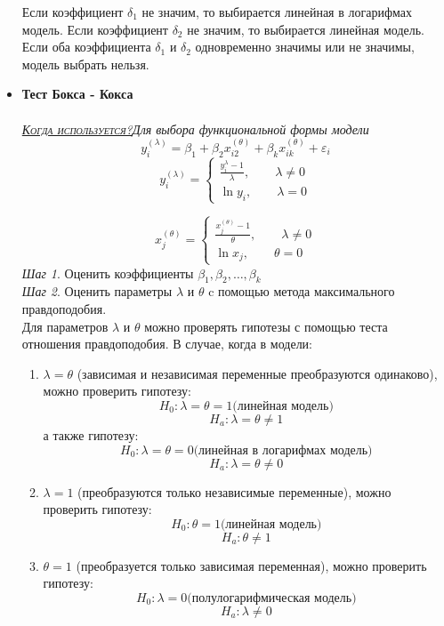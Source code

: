 \documentclass[a0,final]{a0poster}
\begin{document}
\begin{multicols}{4}
\begin{itemize}
Если коэффициент ${\delta}_1$ не значим, то выбирается линейная в логарифмах модель. Если коэффициент ${\delta}_2$ не значим, то выбирается линейная модель. Если оба коэффициента ${\delta}_1$ и ${\delta}_2$ одновременно значимы или не значимы, модель выбрать нельзя.  \\
\item \textbf{Тест Бокса - Кокса}\\
\\
\underline{\textsc{\textit{Когда используется?}}}\textit{Для выбора функциональной формы модели}\\
\[y_i^{(\lambda)} = \beta_1 + \beta_2x_{i2}^{(\theta)} + \beta_kx_{ik}^{(\theta)} + \varepsilon_i\]
\[
y_i^{(\lambda)} =
 \begin{cases}
\frac{y_i^\lambda - 1}{\lambda}, \qquad \lambda \neq 0 \\
\ln{y_i}, \qquad \lambda = 0
\end{cases}
\]

\[x^{(\theta)}_j =  \left\{ \begin{aligned}
\frac{x_j^{(\theta)} - 1}{\theta}, \qquad \lambda \neq 0 \\
\ln{x_j}, \qquad \theta = 0 \end{aligned}
\right.\]
\textit{Шаг 1}. Оценить коэффициенты $\beta_1, \beta_2, \ldots, \beta_k$\\
\textit{Шаг 2}. Оценить параметры $\lambda$ и $\theta$ c помощью метода максимального правдоподобия.\\
Для параметров $\lambda$ и $\theta$ можно проверять гипотезы с помощью теста отношения правдоподобия. В случае, когда в модели:
\begin{enumerate}
\item $\lambda = \theta$ (зависимая и независимая переменные преобразуются одинаково), можно проверить гипотезу:
\[H_0:\lambda = \theta =1 \text{(линейная модель)}\]
\[H_a:\lambda = \theta \neq 1\]
а также гипотезу:
\[H_0: \lambda = \theta =0 \text{(линейная в логарифмах модель)}\]
\[H_a: \lambda = \theta \neq 0\]
\item $\lambda = 1$ (преобразуются только независимые переменные), можно проверить гипотезу:
\[H_0: \theta = 1 \text{(линейная модель)}\]
\[H_a: \theta \neq 1\]
\item $\theta = 1$
(преобразуется только зависимая переменная), можно проверить гипотезу:
\[H_0: \lambda = 0 \text{(полулогарифмическая модель)}\]
\[H_a: \lambda \neq 0\]
\end{enumerate}


\end{itemize}
\end{multicols}
\end{document}
